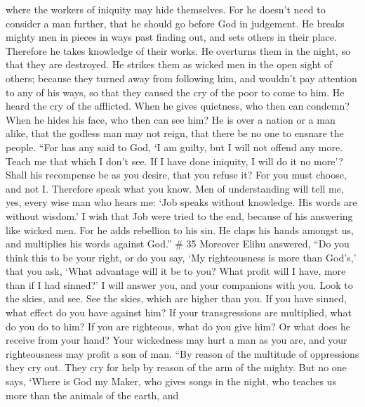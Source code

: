 where the workers of iniquity may hide themselves.  For
he doesn't need to consider a man further, that he should go before God
in judgement.  He breaks mighty men in pieces in ways
past finding out, and sets others in their place. 
Therefore he takes knowledge of their works. He overturns them in the
night, so that they are destroyed.  He strikes them as
wicked men in the open sight of others;  because they
turned away from following him, and wouldn't pay attention to any of his
ways,  so that they caused the cry of the poor to come to
him. He heard the cry of the afflicted.  When he gives
quietness, who then can condemn? When he hides his face, who then can
see him? He is over a nation or a man alike,  that the
godless man may not reign, that there be no one to ensnare the people.
 ``For has any said to God, `I am guilty, but I will not
offend any more.  Teach me that which I don't see. If I
have done iniquity, I will do it no more'?  Shall his
recompense be as you desire, that you refuse it? For you must choose,
and not I. Therefore speak what you know.  Men of
understanding will tell me, yes, every wise man who hears me:
 `Job speaks without knowledge. His words are without
wisdom.'  I wish that Job were tried to the end, because
of his answering like wicked men.  For he adds rebellion
to his sin. He claps his hands amongst us, and multiplies his words
against God.'' \# 35  Moreover Elihu answered,
 ``Do you think this to be your right, or do you say, `My
righteousness is more than God's,'  that you ask, `What
advantage will it be to you? What profit will I have, more than if I had
sinned?'  I will answer you, and your companions with you.
 Look to the skies, and see. See the skies, which are
higher than you.  If you have sinned, what effect do you
have against him? If your transgressions are multiplied, what do you do
to him?  If you are righteous, what do you give him? Or
what does he receive from your hand?  Your wickedness may
hurt a man as you are, and your righteousness may profit a son of man.
 ``By reason of the multitude of oppressions they cry out.
They cry for help by reason of the arm of the mighty. 
But no one says, `Where is God my Maker, who gives songs in the night,
 who teaches us more than the animals of the earth, and
